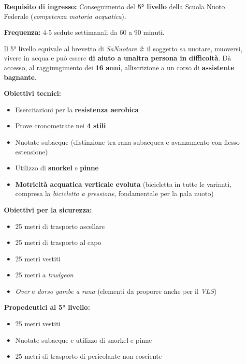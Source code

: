 \documentclass[a4paper,11pt]{article}
\providecommand{\tightlist}{%
  \setlength{\itemsep}{0pt}\setlength{\parskip}{0pt}}
\begin{document}
\textbf{Requisito di ingresso:} Conseguimento del \textbf{5° livello}
della Scuola Nuoto Federale (\emph{competenza motoria acquatica}).

\textbf{Frequenza:} 4-5 sedute settimanali da 60 a 90 minuti.

Il 5° livello equivale al brevetto di \emph{SaNuotare 2}: il soggetto sa
nuotare, muoversi, vivere in acqua e può essere \textbf{di aiuto a
      un\textquotesingle altra persona in difficoltà}. Dà accesso, al
raggiungimento dei \textbf{16 anni}, all\textquotesingle iscrizione a un
corso di \textbf{assistente bagnante}.

\textbf{Obiettivi tecnici:}

\begin{itemize}
      \tightlist
      \item
            Esercitazioni per la \textbf{resistenza aerobica}
      \item
            Prove cronometrate nei \textbf{4 stili}
      \item
            Nuotate subacque (distinzione tra rana subacquea e avanzamento con
            flesso-estensione)
      \item
            Utilizzo di \textbf{snorkel} e \textbf{pinne}
      \item
            \textbf{Motricità acquatica verticale evoluta} (bicicletta in tutte le
            varianti, compresa la \emph{bicicletta a pressione}, fondamentale per
            la pala nuoto)
\end{itemize}

\textbf{Obiettivi per la sicurezza:}

\begin{itemize}
      \tightlist
      \item
            25 metri di trasporto ascellare
      \item
            25 metri di trasporto al capo
      \item
            25 metri vestiti
      \item
            25 metri a \emph{trudgeon}
      \item
            \emph{Over} e \emph{dorso gambe a rana} (elementi da proporre anche
            per il \emph{VLS})
\end{itemize}

\textbf{Propedeutici al 5° livello:}

\begin{itemize}
      \tightlist
      \item
            25 metri vestiti
      \item
            Nuotate subacque e utilizzo di snorkel e pinne
      \item
            25 metri di trasporto di pericolante non cosciente
\end{itemize}
\end{document}
